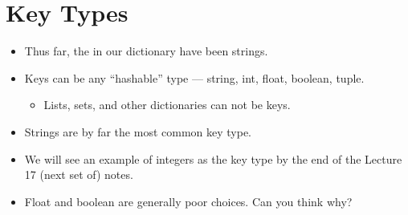 \documentclass[letterpaper,10pt,english]{sphinxmanual}
\begin{document}
\section{Key Types}
\label{\detokenize{lecture_notes/lec16_dictionaries1:key-types}}\begin{itemize}
\item {} 
Thus far, the  in our dictionary have been strings.

\item {} 
Keys can be any “hashable” type — string, int, float, boolean, tuple.
\begin{itemize}
\item {} 
Lists, sets, and other dictionaries can not be keys.

\end{itemize}

\item {} 
Strings are by far the most common key type.

\item {} 
We will see an example of integers as the key type by the end of
the Lecture 17 (next set of) notes.

\item {} 
Float and boolean are generally poor choices. Can you think why?

\end{itemize}
\end{document}
